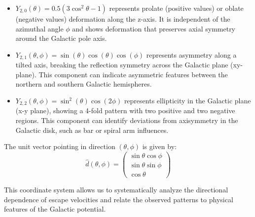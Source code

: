 \documentclass[%
 reprint,
 amsmath,amssymb,
 aps,
]{revtex4-2}
\begin{document}
\begin{itemize}
    \item $Y_{2,0}(\theta) = 0.5(3\cos^2\theta - 1)$ represents prolate (positive values) or oblate (negative values) deformation along the z-axis. It is independent of the azimuthal angle $\phi$ and shows deformation that preserves axial symmetry around the Galactic pole axis.
    
    \item $Y_{2,1}(\theta,\phi) = \sin(\theta)\cos(\theta)\cos(\phi)$ represents asymmetry along a tilted axis, breaking the reflection symmetry across the Galactic plane (xy-plane). This component can indicate asymmetric features between the northern and southern Galactic hemispheres.
    
    \item $Y_{2,2}(\theta,\phi) = \sin^2(\theta)\cos(2\phi)$ represents ellipticity in the Galactic plane (x-y plane), showing a 4-fold pattern with two positive and two negative regions. This component can identify deviations from axisymmetry in the Galactic disk, such as bar or spiral arm influences.
\end{itemize}

The unit vector pointing in direction $(\theta,\phi)$ is given by:
\begin{equation}
\hat{d}(\theta,\phi) = 
\begin{pmatrix}
\sin\theta \cos\phi \\
\sin\theta \sin\phi \\
\cos\theta
\end{pmatrix}
\end{equation}

This coordinate system allows us to systematically analyze the directional dependence of escape velocities and relate the observed patterns to physical features of the Galactic potential.


    
\end{document}
